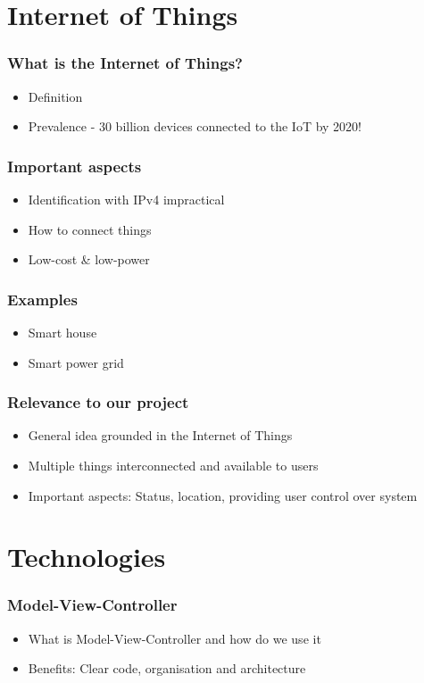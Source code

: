 \section{Internet of Things}

\begin{frame}
\frametitle{What is the Internet of Things?}
\begin{itemize}
\item Definition
\item Prevalence - 30 billion devices connected to the IoT by 2020!
\end{itemize}
\end{frame}

\begin{frame}
\frametitle{Important aspects}
\begin{itemize}
\item Identification with IPv4 impractical
\item How to connect things
\item Low-cost \& low-power
\end{itemize}
\end{frame}

\begin{frame}
\frametitle{Examples}
\begin{itemize}
\item Smart house
\item Smart power grid
\end{itemize}
\end{frame}

\begin{frame}
\frametitle{Relevance to our project}
\begin{itemize}
\item General idea grounded in the Internet of Things
\item Multiple things interconnected and available to users
\item Important aspects: Status, location, providing user control over system
\end{itemize}
\end{frame}

\section{Technologies}
\begin{frame}
\frametitle{Model-View-Controller}
\begin{itemize}
\item What is Model-View-Controller and how do we use it
\item Benefits: Clear code, organisation and architecture
\end{itemize}
\end{frame}

